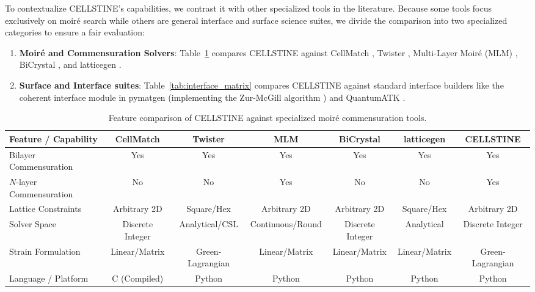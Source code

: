 \documentclass[9pt,a4paper,twoside]{tau-class/tau}
\begin{document}
To contextualize CELLSTINE's capabilities, we contrast it with other specialized tools in the literature. Because some tools focus exclusively on moir\'e search while others are general interface and surface science suites, we divide the comparison into two specialized categories to ensure a fair evaluation:
\begin{enumerate}[label=\arabic*.]
    \item \textbf{Moir\'e and Commensuration Solvers}: Table~\ref{tab:moire_matrix} compares CELLSTINE against CellMatch \cite{cellmatch}, Twister \cite{twister}, Multi-Layer Moir\'e (MLM) \cite{mlm}, BiCrystal \cite{bicrystal}, and latticegen \cite{latticegen}.
    \item \textbf{Surface and Interface suites}: Table~\ref{tab:interface_matrix} compares CELLSTINE against standard interface builders like the coherent interface module in pymatgen \cite{pymatgen} (implementing the Zur-McGill algorithm \cite{zur1984systematic}) and QuantumATK \cite{quantumatk}.
\end{enumerate}

\begin{table}[!t]
    \centering
    \caption{Feature comparison of CELLSTINE against specialized moir\'e commensuration tools.}
    \label{tab:moire_matrix}
    \small
    \begin{tabular*}{\textwidth}{@{\extracolsep{\fill}}lcccccc@{}}
        \toprule
        \textbf{Feature / Capability} & \textbf{CellMatch} \cite{cellmatch} & \textbf{Twister} \cite{twister} & \textbf{MLM} \cite{mlm} & \textbf{BiCrystal} \cite{bicrystal} & \textbf{latticegen} \cite{latticegen} & \textbf{CELLSTINE} \\
        \midrule
        Bilayer Commensuration & Yes & Yes & Yes & Yes & Yes & Yes \\
        $N$-layer Commensuration & No & No & Yes & No & No & Yes \\
        Lattice Constraints & Arbitrary 2D & Square/Hex & Arbitrary 2D & Arbitrary 2D & Square/Hex & Arbitrary 2D \\
        Solver Space & Discrete Integer & Analytical/CSL & Continuous/Round & Discrete Integer & Analytical & Discrete Integer \\
        Strain Formulation & Linear/Matrix & Green-Lagrangian & Linear/Matrix & Linear/Matrix & Linear/Matrix & Green-Lagrangian \\
        Language / Platform & C (Compiled) & Python & Python & Python & Python & Python \\
        \bottomrule
    \end{tabular*}
\end{table}
\end{document}
